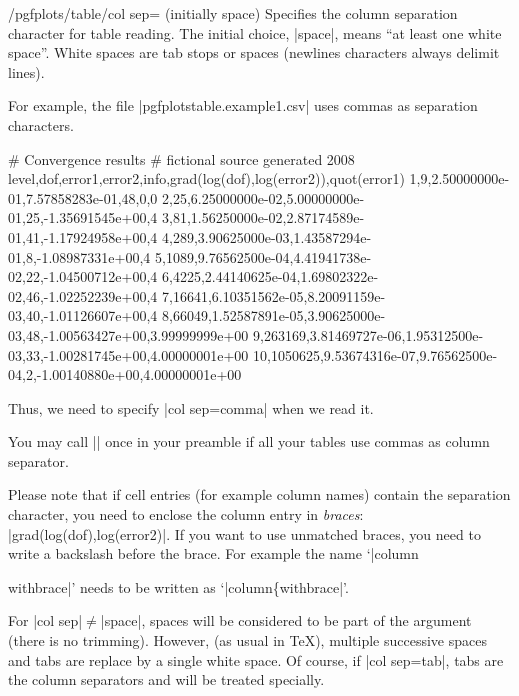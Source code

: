 \begin{key}{/pgfplots/table/col sep= (initially space)}
    Specifies the column separation character for table reading. The initial
    choice, |space|, means ``at least one white space''. White spaces are tab
    stops or spaces (newlines characters always delimit lines).

    For example, the file |pgfplotstable.example1.csv| uses commas as
    separation characters.
\begin{codeexample}
# Convergence results
# fictional source generated 2008
level,dof,error1,error2,info,{grad(log(dof),log(error2))},quot(error1)
1,9,2.50000000e-01,7.57858283e-01,48,0,0
2,25,6.25000000e-02,5.00000000e-01,25,-1.35691545e+00,4
3,81,1.56250000e-02,2.87174589e-01,41,-1.17924958e+00,4
4,289,3.90625000e-03,1.43587294e-01,8,-1.08987331e+00,4
5,1089,9.76562500e-04,4.41941738e-02,22,-1.04500712e+00,4
6,4225,2.44140625e-04,1.69802322e-02,46,-1.02252239e+00,4
7,16641,6.10351562e-05,8.20091159e-03,40,-1.01126607e+00,4
8,66049,1.52587891e-05,3.90625000e-03,48,-1.00563427e+00,3.99999999e+00
9,263169,3.81469727e-06,1.95312500e-03,33,-1.00281745e+00,4.00000001e+00
10,1050625,9.53674316e-07,9.76562500e-04,2,-1.00140880e+00,4.00000001e+00
\end{codeexample}
    Thus, we need to specify |col sep=comma| when we read it.
\begin{codeexample}[pre={\begin{lateximage}},post={\end{lateximage}}]
\end{codeexample}
    You may call || once in your preamble if
    all your tables use commas as column separator.

    Please note that if cell entries (for example column names) contain the
    separation character, you need to enclose the column entry in
    \emph{braces}: |{grad(log(dof),log(error2)}|. If you want to use unmatched
    braces, you need to write a backslash before the brace. For example the
    name `|column{withbrace|' needs to be written as `|column\{withbrace|'.

    For |col sep|$\neq$|space|, spaces will be considered to be part of the
    argument (there is no trimming). However, (as usual in \TeX{}), multiple
    successive spaces and tabs are replace by a single white space. Of course,
    if |col sep=tab|, tabs are the column separators and will be treated
    specially.

}
\end{key}

